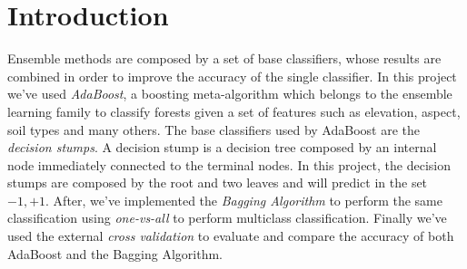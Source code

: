 \chapter{Introduction}
Ensemble methods are composed by a set of base classifiers, whose results are combined in order to improve the accuracy of the single classifier. In this project we've used \textit{AdaBoost}, a boosting meta-algorithm which belongs to the ensemble learning family to classify forests given a set of features such as elevation, aspect, soil types and many others. The base classifiers used by AdaBoost are the \textit{decision stumps}. A decision stump is a decision tree composed by an internal node immediately connected to the terminal nodes. In this project, the decision stumps are composed by the root and two leaves and will predict in the set ${-1, +1}$. After, we've implemented the \textit{Bagging Algorithm} to perform the same classification using \textit{one-vs-all} to perform multiclass classification. Finally we've used the external \textit{cross validation} to evaluate and compare the accuracy of both AdaBoost and the Bagging Algorithm.